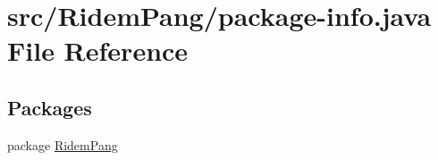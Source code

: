 \hypertarget{_ridem_pang_2package-info_8java}{\section{src/\-Ridem\-Pang/package-\/info.java File Reference}
\label{_ridem_pang_2package-info_8java}
}
\subsection*{Packages}
\begin{DoxyCompactItemize}
\item 
package \hyperlink{namespace_ridem_pang}{Ridem\-Pang}
\end{DoxyCompactItemize}

